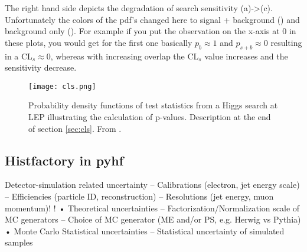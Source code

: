 The right hand side depicts the degradation of search sensitivity (a)->(c). Unfortunately the colors of the pdf's changed here to signal + background () and background only (). For example if you put the observation on the x-axis at 0 in these plots, you would get for the first one basically $p_{b}\approx 1$ and $p_{s+b}\approx 0$ resulting in a CL$_s\approx 0$, whereas with increasing overlap the CL$_s$ value increases and the sensitivity decrease.

\begin{figure}
    \centering
    \texttt{[image: cls.png]}
        \caption[]{Probability density functions of test statistics from a Higgs search at LEP illustrating the calculation of p-values. Description at the end of section \ref{sec:cls}. From \citep{read2002presentation}.}
    \label{fig:cls}    
\end{figure}



\subsection{Histfactory in pyhf}



Detector-simulation related uncertainty
– Calibrations (electron, jet energy scale)
– Efficiencies (particle ID, reconstruction)
– Resolutions (jet energy, muon momentum)!
!
• Theoretical uncertainties
– Factorization/Normalization scale of MC generators
– Choice of MC generator (ME and/or PS, e.g. Herwig vs Pythia)
• Monte Carlo Statistical uncertainties
– Statistical uncertainty of simulated samples

